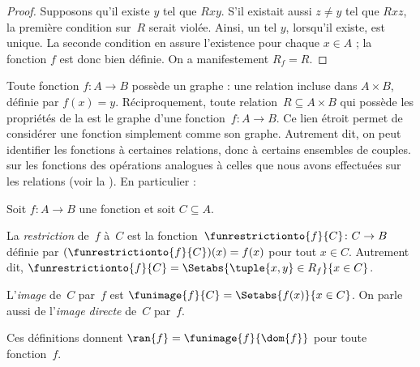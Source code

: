 \documentclass[11pt,a4paper,openany]{memoir}
\begin{document}
\begin{proof}
Supposons qu’il existe $y$ tel que $Rxy$. S’il existait aussi $z \neq y$
tel que $Rxz$, la première condition sur~$R$ serait violée. Ainsi, un tel
$y$, lorsqu’il existe, est unique. La seconde condition en assure
l’existence pour chaque $x \in A$ ; la fonction $f$ est donc bien définie.
On a manifestement $R_f = R$.
\end{proof}

\begin{explain}
Toute fonction $f\colon A \to B$ possède un graphe : une relation
incluse dans $A \times B$, définie par $f(x) = y$. Réciproquement, toute
relation~$R \subseteq A \times B$ qui possède les propriétés de la
 est le graphe d’une fonction~$f\colon A \to B$.
Ce lien étroit permet de considérer une fonction simplement comme son
graphe. Autrement dit, on peut identifier les fonctions à certaines
relations, donc à certains ensembles de couples.
sur les fonctions des opérations analogues à celles que nous
avons effectuées sur les relations (voir la ).
En particulier :
\end{explain}

\begin{defn}
Soit $f\colon A \to B$ une fonction et soit $C\subseteq A$.

La \emph{restriction} de~$f$ à~$C$ est la
fonction~$\funrestrictionto{f}{C}\colon C \to B$ définie par
$(\funrestrictionto{f}{C})(x) = f(x)$ pour tout $x \in C$.
Autrement dit, $\funrestrictionto{f}{C} =
\Setabs{\tuple{x, y} \in R_f}{x \in C}$.

L’\emph{image} de~$C$ par~$f$ est $\funimage{f}{C} =
\Setabs{f(x)}{x \in C}$. On parle aussi de l’\emph{image directe}
de~$C$ par~$f$.
\end{defn}

\begin{explain}
Ces définitions donnent $\ran{f} = \funimage{f}{\dom{f}}$ pour toute
fonction~$f$.
\end{explain}
\end{document}

